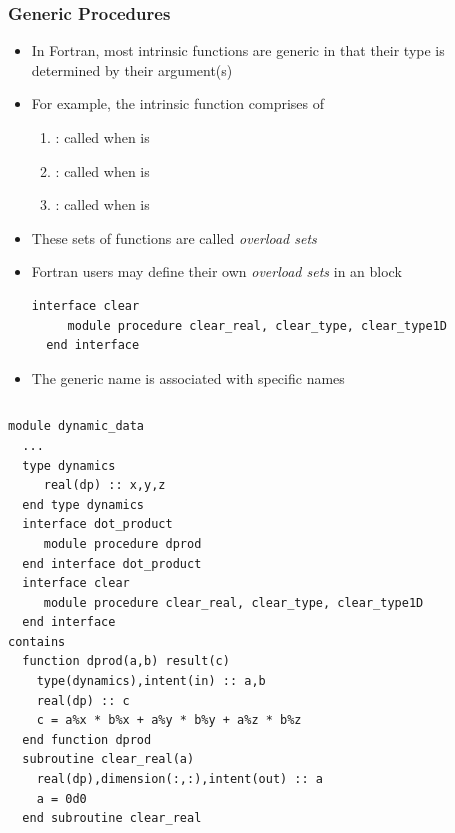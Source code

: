\documentclass[10pt,t]{beamer}
\begin{document}
\begin{frame}
  \frametitle{\small Generic Procedures}
  \begin{itemize}
    \item In Fortran, most intrinsic functions are generic in that their type is determined by their argument(s)
    \item For example, the  intrinsic function comprises of
    \begin{enumerate}
      \item {} : called when  is 
      \item {} : called when  is 
      \item {} : called when  is 
    \end{enumerate}
    \item These sets of functions are called \textit{overload sets}
    \item Fortran users may define their own \textit{overload sets} in an  block
      \begin{lstlisting}[language={[90]Fortran},basicstyle=\fontsize{5}{6}\selectfont\ttfamily]
  interface clear
     module procedure clear_real, clear_type, clear_type1D
  end interface
      \end{lstlisting}
    \item The generic name  is associated with specific names 
  \end{itemize}
  \framebreak
  {\fontsize{4}{5}
    \begin{columns}[t]
      \column{5cm}
      \vspace{-0.5cm}
      \begin{eblock}{}
        \begin{lstlisting}[language={[90]Fortran},basicstyle=\fontsize{5}{6}\selectfont\ttfamily]
module dynamic_data
  ...
  type dynamics
     real(dp) :: x,y,z
  end type dynamics
  interface dot_product
     module procedure dprod
  end interface dot_product
  interface clear
     module procedure clear_real, clear_type, clear_type1D
  end interface
contains
  function dprod(a,b) result(c)
    type(dynamics),intent(in) :: a,b
    real(dp) :: c
    c = a%x * b%x + a%y * b%y + a%z * b%z
  end function dprod
  subroutine clear_real(a)
    real(dp),dimension(:,:),intent(out) :: a
    a = 0d0
  end subroutine clear_real


\end{lstlisting}
\end{eblock}
\end{columns}}
\end{frame}
\end{document}
